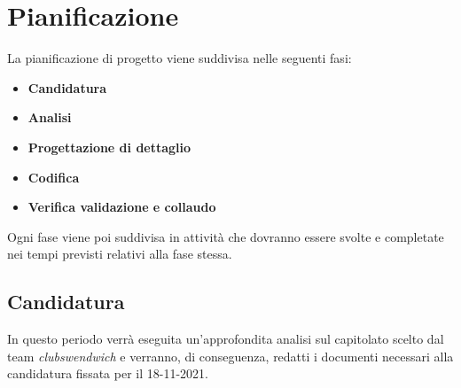 \section{Pianificazione}
La pianificazione di progetto viene suddivisa nelle seguenti fasi:
\begin{itemize}
    \item \textbf{Candidatura}
    \item \textbf{Analisi}
    \item \textbf{Progettazione di dettaglio}
    \item \textbf{Codifica}
    \item \textbf{Verifica validazione e collaudo}
\end{itemize} 
Ogni fase viene poi suddivisa in attività che dovranno essere svolte e completate nei tempi previsti relativi alla fase stessa.

\subsection{Candidatura}
In questo periodo verrà eseguita un'approfondita analisi sul capitolato scelto dal team \textit{clubswendwich} e verranno, di conseguenza, redatti i documenti necessari alla candidatura fissata per il 18-11-2021.

